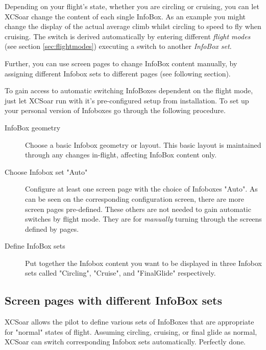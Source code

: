 Depending on your flight's state, whether you are circling or cruising, you can 
let XCSoar change the content of each single InfoBox. As an example you might 
change the display of the actual average climb whilst circling to speed to fly 
when cruising. The switch is derived automatically by entering different 
\emph{flight modes} (see section \ref{sec:flightmodes}) executing a switch to 
another \emph{InfoBox set}.

Further, you can use screen pages to change InfoBox content manually, by 
assigning different Infobox sets to different pages (see following section).

To gain access to automatic switching InfoBoxes dependent on the flight mode, 
just let XCSoar run with it's pre-configured setup from installation. To set up 
your personal version of Infoboxes go through the following procedure.
\begin{description}
\item[InfoBox geometry] Choose a basic Infobox geometry or layout.  This basic 
layout is maintained through any changes in-flight, affecting InfoBox content 
only.
\item[Choose Infobox set "Auto"] Configure at least one screen page with the 
choice of Infoboxes "Auto". As can be seen on the corresponding configuration 
screen, there are more screen pages pre-defined.   These 
others are not needed to gain automatic switches by flight mode. They are for \emph{manually} turning through the screens defined by pages. 
\item[Define InfoBox sets] Put together the Infobox content you want to be 
displayed in three Infobox sets called "Circling", "Cruise", and "FinalGlide" 
respectively.
\end{description}  


\subsection*{Screen pages with different InfoBox sets}\label{sec:screenpages}

XCSoar allows the pilot to define various sets of InfoBoxes that are 
appropriate for "normal" states of flight.  Assuming circling, 
cruising, or final glide as normal, XCSoar can switch corresponding Infobox 
sets automatically. Perfectly done.

